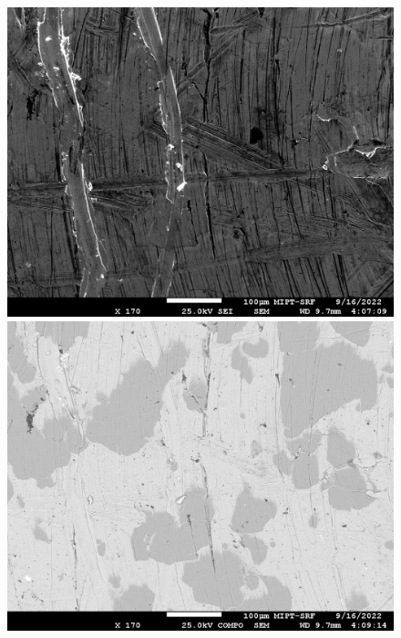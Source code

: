 \documentclass[a4paper,12pt]{article} %
\begin{document}
\begin{figure}[h]
\centering
\begin{minipage}{0.49\textwidth}
\includegraphics[width=\textwidth]{Tablet002.jpg}
\vspace{-2em}
\end{minipage}
\begin{minipage}{0.49\textwidth}
\includegraphics[width=\textwidth]{Tablet003.jpg}
\vspace{-2em}
\end{minipage}
\begin{minipage}{0.49\textwidth}

\end{minipage}
\end{figure}
\end{document}
